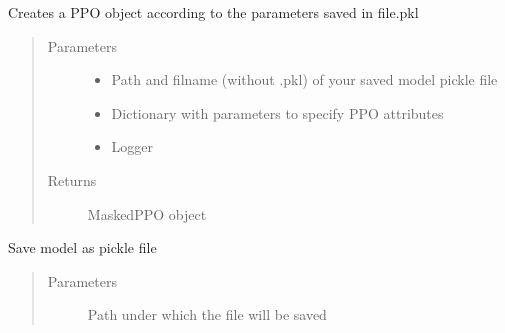 \documentclass[letterpaper,10pt,english]{sphinxmanual}
\begin{document}
\begin{fulllineitems}

\begin{fulllineitems}
\label{\detokenize{agents.reinforcement_learning:agents.reinforcement_learning.ppo.PPO.load}}
\sphinxAtStartPar
Creates a PPO object according to the parameters saved in file.pkl
\begin{quote}\begin{description}
\item[{Parameters}] \leavevmode\begin{itemize}
\item {} 
\sphinxAtStartPar
{} \textendash{} Path and filname (without .pkl) of your saved model pickle file

\item {} 
\sphinxAtStartPar
{} \textendash{} Dictionary with parameters to specify PPO attributes

\item {} 
\sphinxAtStartPar
{} \textendash{} Logger

\end{itemize}

\item[{Returns}] \leavevmode
\sphinxAtStartPar
MaskedPPO object

\end{description}\end{quote}

\end{fulllineitems}


\begin{fulllineitems}
\label{\detokenize{agents.reinforcement_learning:agents.reinforcement_learning.ppo.PPO.save}}
\sphinxAtStartPar
Save model as pickle file
\begin{quote}\begin{description}
\item[{Parameters}] \leavevmode
\sphinxAtStartPar
{} \textendash{} Path under which the file will be saved


\end{description}
\end{quote}
\end{fulllineitems}
\end{fulllineitems}
\end{document}
